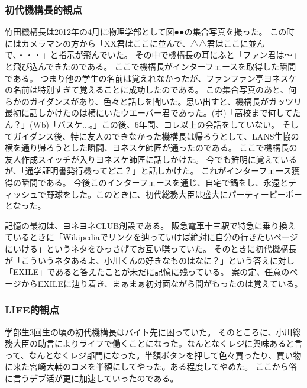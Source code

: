 \subsubsection{初代機構長的観点}
竹田機構長は2012年の4月に物理学部として図●●の集合写真を撮った。
この時にはカメラマンの方から「XX君はここに並んで、△△君はここに並んで、・・・」と指示が飛んでいた。
その中で機構長の耳にふと「ファン君は〜」と飛び込んできたのである。
ここで機構長がインターフェースを取得した瞬間である。
つまり他の学生の名前は覚えれなかったが、ファンファン亭ヨネスケの名前は特別すぎて覚えることに成功したのである。
この集合写真のあと、何らかのガイダンスがあり、色々と話しを聞いた。思い出すと、機構長がガッツリ最初に話しかけたのは横にいたウエーバー君であった。(ポ)「高校まで何してたん？」(Wb)「バスケ...。」この後、6年間、コレ以上の会話をしていない。
そしてガイダンス後、特に友人のできなかった機構長は帰ろうとして、LANS生協の横を通り帰ろうとした瞬間、ヨネスケ師匠が通ったのである。
ここで機構長の友人作成スイッチが入りヨネスケ師匠に話しかけた。
今でも鮮明に覚えているが、「通学証明書発行機ってどこ？」と話しかけた。
これがインターフェース獲得の瞬間である。
今後このインターフェースを通じ、自宅で鍋をし、永遠とティッシュで野球をした。このときに、初代総務大臣は盛大にパーティーピーポーとなった。
\par
記憶の最初は、ヨネヨネCLUB創設である。
阪急電車十三駅で特急に乗り換えているときに「Wikipediaでリンクを辿っていけば絶対に自分の行きたいページにいける」というネタをひっさげてお互い喋っていた。
そのときに初代機構長が「こういうネタあるよ、小川くんの好きなものはなに？」という答えに対し「EXILE」であると答えたことが未だに記憶に残っている。
案の定、任意のページからEXILEに辿り着き、まぁまぁ初対面ながら間がもったのは覚えている。

\subsubsection{LIFE的観点}
学部生3回生の頃の初代機構長はバイト先に困っていた。
そのところに、小川総務大臣の助言によりライフで働くことになった。なんとなくレジに興味あると言って、なんとなくレジ部門になった。半額ボタンを押して色々買ったり、買い物に来た宮崎大輔のコメを半額にしてやった。ある程度してやめた。
ここから俗に言うデブ活が更に加速していったのである。


